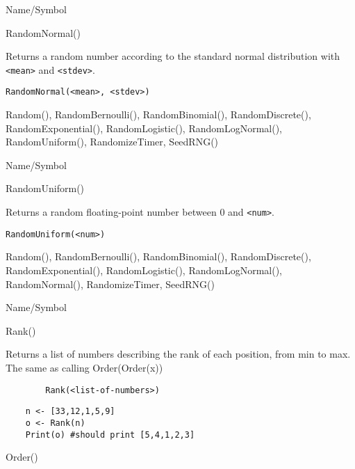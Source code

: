 \rl


\begin{desc}{Name/Symbol}
\item[Name/Symbol] 	RandomNormal()

\item[Description] 	Returns a random number according to the standard
             	normal distribution with \verb+<mean>+ and \verb+<stdev>+.

\item[Usage]       	
\begin{verbatim}
RandomNormal(<mean>, <stdev>)
\end{verbatim}

\item[Example]	

\item[See Also]	Random(), RandomBernoulli(), RandomBinomial(),
		RandomDiscrete(), RandomExponential(), RandomLogistic(), 
		RandomLogNormal(), RandomUniform(), RandomizeTimer, SeedRNG()
\end{desc}

\rl


\begin{desc}{Name/Symbol}
\item[Name/Symbol]	RandomUniform()

\item[Description]	Returns a random floating-point number between 0 and \verb+<num>+.

\item[Usage]		
\begin{verbatim}
RandomUniform(<num>)
\end{verbatim}

\item[Example]	

\item[See Also]    	Random(), RandomBernoulli(), RandomBinomial(), 
			RandomDiscrete(), RandomExponential(), RandomLogistic(), 
			RandomLogNormal(), RandomNormal(), RandomizeTimer, SeedRNG()
\end{desc}

\rl



\begin{desc}{Name/Symbol}
\item[Name/Symbol]	Rank()

\item[Description]	Returns a list of numbers describing the rank of
  each position, from min to max.  The same as calling Order(Order(x))

\item[Usage]
\begin{verbatim}
		Rank(<list-of-numbers>)
\end{verbatim}

\item[Example]	
\begin{verbatim}
	n <- [33,12,1,5,9]
  	o <- Rank(n)
    Print(o) #should print [5,4,1,2,3]
\end{verbatim}

\item[See Also]	Order()
\end{desc}

